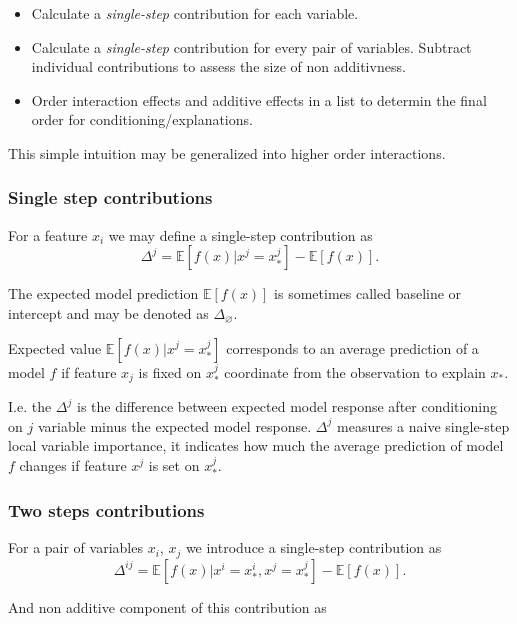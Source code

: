 \documentclass[12pt,]{krantz}
\providecommand{\tightlist}{%
  \setlength{\itemsep}{0pt}\setlength{\parskip}{0pt}}
\theoremstyle{definition}
\theoremstyle{definition}
\theoremstyle{definition}
\theoremstyle{remark}
\begin{document}
\begin{itemize}
\tightlist
\item
  Calculate a \emph{single-step} contribution for each variable.
\item
  Calculate a \emph{single-step} contribution for every pair of
  variables. Subtract individual contributions to assess the size of non
  additivness.
\item
  Order interaction effects and additive effects in a list to determin
  the final order for conditioning/explanations.
\end{itemize}

This simple intuition may be generalized into higher order interactions.

\hypertarget{single-step-contributions}{%
\subsubsection{Single step
contributions}\label{single-step-contributions}}

For a feature \(x_i\) we may define a single-step contribution as \[
\Delta^j =  \mathbb{E}[f(x)|x^j = x_*^j] - \mathbb{E}[f(x)].
\]

The expected model prediction \(\mathbb{E}[f(x)]\) is sometimes called
baseline or intercept and may be denoted as \(\Delta_\varnothing\).

Expected value \(\mathbb{E}[f(x)|x^j = x_*^j]\) corresponds to an
average prediction of a model \(f\) if feature \(x_j\) is fixed on
\(x^j_*\) coordinate from the observation to explain \(x_*\).

I.e. the \(\Delta^j\) is the difference between expected model response
after conditioning on \(j\) variable minus the expected model response.
\(\Delta^j\) measures a naive single-step local variable importance, it
indicates how much the average prediction of model \(f\) changes if
feature \(x^j\) is set on \(x_*^j\).

\hypertarget{two-steps-contributions}{%
\subsubsection{Two steps contributions}\label{two-steps-contributions}}

For a pair of variables \(x_i\), \(x_j\) we introduce a single-step
contribution as \[
\Delta^{ij} =  \mathbb{E}[f(x)|x^i = x_*^i, x^j = x_*^j] - \mathbb{E}[f(x)].
\]

And non additive component of this contribution as
\end{document}
